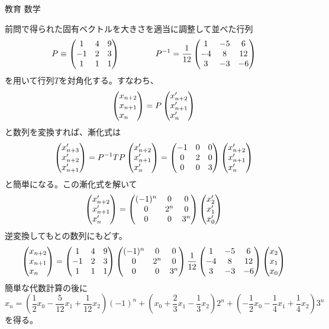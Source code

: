 \documentclass[fleqn]{jbook}
\begin{document}
\begin{answer}{教育 数学}{}
\begin{subanswers}
\begin{subsubanswers}
  \SubSubAnswer
    前問で得られた固有ベクトルを大きさを適当に調整して並べた行列
%
    \[ P \equiv \begin{pmatrix}%
             1 & 4 & 9 \\
            -1 & 2 & 3 \\
             1 & 1 & 1 \end{pmatrix} \hspace{15mm}%
       P^{-1} = \frac{1}{12}\begin{pmatrix}%
             1 & -5 &  6 \\
            -4 &  8 & 12 \\
             3 & -3 & -6 \end{pmatrix} \]
%
    を用いて行列$T$を対角化する。すなわち、
%
    \[ \vect{x_{n+2}}{x_{n+1}}{x_{n}\hfill}%
        = P \vect{x_{n+2}^\prime}{x_{n+1}^\prime}{x_{n}^\prime\hfill} \]
%
    と数列を変換すれば、漸化式は
%
    \[ \vect{x_{n+3}^\prime}{x_{n+2}^\prime}{x_{n+1}^\prime}%
        = P^{-1}TP \vect{x_{n+2}^\prime}{x_{n+1}^\prime}{x_{n}^\prime\hfill}%
        = \begin{pmatrix}%
           -1 & 0 & 0 \\
            0 & 2 & 0 \\
            0 & 0 & 3 \end{pmatrix}%
          \vect{x_{n+2}^\prime}{x_{n+1}^\prime}{x_{n}^\prime\hfill} \]
%
    と簡単になる。この漸化式を解いて
%
    \[ \vect{x_{n+2}^\prime}{x_{n+1}^\prime}{x_{n}^\prime\hfill}%
        = \begin{pmatrix}%
           (-1)^n & 0 & 0 \\
            0 & 2^n & 0 \\
            0 & 0 & 3^n \end{pmatrix}%
          \vect{x_2^\prime}{x_1^\prime}{x_0^\prime} \]
%
    逆変換してもとの数列にもどす。
%
    \[ \vect{x_{n+2}}{x_{n+1}}{x_{n}\hfill}%
       = \begin{pmatrix}%
           1 & 4 & 9 \\
          -1 & 2 & 3 \\
           1 & 1 & 1 \end{pmatrix}%
         \begin{pmatrix}%
           (-1)^n & 0     & 0 \\
           0      & 2^{n} & 0 \\
           0      & 0     & 3^n \end{pmatrix}%
         \frac{1}{12}\begin{pmatrix}%
             1 & -5 &  6 \\
            -4 &  8 & 12 \\
             3 & -3 & -6 \end{pmatrix}
         \vect{x_2}{x_1}{x_0} \]
%
    簡単な代数計算の後に
%
    \[
      x_{n} =%
        \left(%
          \frac{1}{2}x_0 - \frac{5}{12}x_1 + \frac{1}{12}x_2%
        \right)(-1)^n%
      + \left(%
          x_0 + \frac{2}{3}x_1 - \frac{1}{3}x_2%
        \right)2^n%
      + \left(%
          -\frac{1}{2}x_0 - \frac{1}{4}x_1 + \frac{1}{4}x_2
        \right)3^n
    \]
%
    を得る。


\end{subsubanswers}
\end{subanswers}
\end{answer}
\end{document}
